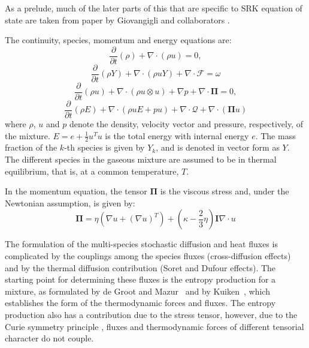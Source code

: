 \documentclass[11pt]{article}
\newcommand{\HeatFlux}{\boldsymbol{\mathcal{Q}}}
\newcommand{\SpeciesFlux}{\boldsymbol{\mathcal{F}}}
\newcommand{\StressTensor}{\boldsymbol{\Pi}}
\newcommand{\half}{\frac{1}{2}}
\begin{document}
As a prelude, much of the later parts of this that are specific to SRK equation of state are taken from 
paper by Giovangigli and collaborators \cite{giovangigli_CTM:2011,giovangigli:2012}.

The continuity, species, momentum and energy equations are:
\begin{equation}
\frac{\partial }{\partial t} \left( \rho \right)  + { \nabla} \cdot \left( \rho { u} \right) = 0,
\label{eqn:cont}
\end{equation}
\begin{equation}
\frac{\partial }{\partial t} \left( \rho Y \right)  + { \nabla} \cdot \left( \rho { u} Y \right) + { \nabla} \cdot
\SpeciesFlux
=  \omega 
\label{eqn:spec}
\end{equation}
\begin{equation}
\frac{\partial }{\partial t} \left( \rho { u} \right)  + { \nabla} \cdot \left( \rho { u \otimes u } \right) + { \nabla} p + {\nabla} \cdot   \StressTensor = 0,
\label{eqn:mom}
\end{equation}
\begin{equation}
\frac{\partial }{\partial t} \left( \rho E \right)  + { \nabla} \cdot \left( \rho { u} E + p { u}  \right) + { \nabla} \cdot  { \HeatFlux}  + \nabla \cdot (\StressTensor u)
\label{eqn:energy}
\end{equation}
where $\rho$, ${u}$ and $p$ denote the density, velocity vector and pressure, respectively, of the mixture.
$E = e + \half u^T u$ is the total energy with internal energy $e$.
The mass fraction of the $k$-th species is given by $Y_k$, and is denoted in vector form as $Y$.
The different species in the gaseous mixture are assumed to be in thermal equilibrium,
that is, at a common temperature, $T$.

In the momentum equation, the tensor $\StressTensor$ is the viscous stress and, under the Newtonian assumption, is given by:
\begin{equation}
\StressTensor = \eta ( \nabla u + ( \nabla u )^T) + ( \kappa - \frac{2}{3} \eta) \mathbf{I} \nabla \cdot u
\end{equation}

The formulation of the multi-species stochastic diffusion and heat fluxes is complicated by the couplings among the species fluxes (cross-diffusion effects) and by the thermal diffusion contribution (Soret and Dufour effects).
The starting point for determining these fluxes
is the entropy production for a mixture, as formulated by de Groot and Mazur~\cite{DM_63} and by Kuiken~\cite{NewIrrevThermoBook},
which establishes the form of the thermodynamic forces and fluxes.
The entropy production also has a contribution due to the stress tensor, however,
due to the Curie symmetry principle \cite{DM_63}, fluxes and thermodynamic forces of different tensorial
character do not couple.
\end{document}
